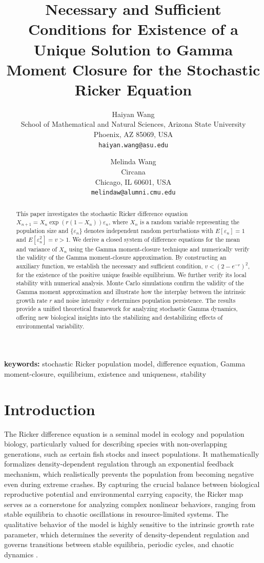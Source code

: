 \documentclass[12pt]{article}
\title{Necessary and Sufficient Conditions for Existence of a Unique Solution to Gamma Moment Closure for the Stochastic Ricker Equation}
\author{
Haiyan Wang \\ 
School of Mathematical and Natural Sciences, Arizona State University \\ 
Phoenix, AZ 85069, USA \\ 
\texttt{haiyan.wang@asu.edu}
\and
Melinda Wang \\ 
Circana \\ 
Chicago, IL 60601, USA \\ 
\texttt{melindaw@alumni.cmu.edu}
}
\date{}
\theoremstyle{definition}
\begin{document}
\maketitle

\begin{abstract}
This paper investigates the stochastic Ricker difference equation $X_{n+1} = X_n \exp(r(1-X_n)) \varepsilon_n$, where $X_n$ is a random variable representing the population size and $\{\varepsilon_n\}$ denotes independent random perturbations with $E[\varepsilon_n] = 1$ and $E[\varepsilon_n^2] = v > 1$. We derive a closed system of difference equations for the mean and variance of $X_n$ using the Gamma moment-closure technique and numerically verify the validity of the Gamma moment-closure approximation. By constructing an auxiliary function, we establish the necessary and sufficient condition, $v < (2 - e^{-r})^2$, for the existence of the positive unique feasible equilibrium. We further verify its local stability with numerical analysis. Monte Carlo simulations confirm the validity of the Gamma moment approximation and illustrate how the interplay between the intrinsic growth rate $r$ and noise intensity $v$ determines population persistence. The results provide a unified theoretical framework for analyzing stochastic Gamma dynamics, offering new biological insights into the stabilizing and destabilizing effects of environmental variability.
\end{abstract}

\textbf{keywords:} stochastic Ricker population model, difference equation, Gamma moment-closure, equilibrium, existence and uniqueness, stability    

\section{Introduction}\label{in}
The Ricker difference equation is a seminal model in ecology and population biology, particularly valued for describing species with non-overlapping generations, such as certain fish stocks and insect populations. It mathematically formalizes density-dependent regulation through an exponential feedback mechanism, which realistically prevents the population from becoming negative even during extreme crashes. By capturing the crucial balance between biological reproductive potential and environmental carrying capacity, the Ricker map serves as a cornerstone for analyzing complex nonlinear behaviors, ranging from stable equilibria to chaotic oscillations in resource-limited systems. The qualitative behavior of the model is highly sensitive to the intrinsic growth rate parameter, which determines the severity of density-dependent regulation and governs transitions between stable equilibria, periodic cycles, and chaotic dynamics \cite{ricker1954stock,murray2002,may1976simple,kot2001elements,strogatz2018nonlinear,Koetke2020}.
\end{document}
